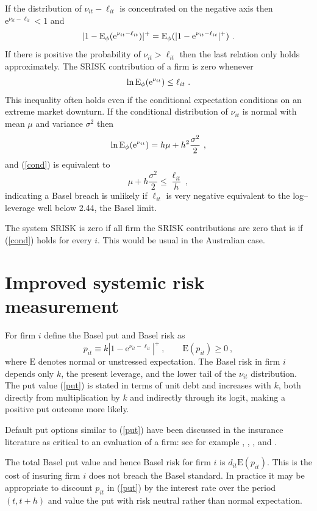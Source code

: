 \documentclass[authoryear]{elsarticle}
\newcommand{\E}{\mathrm{E}}
\newcommand{\e}{\mathrm{e}}
\newcommand{\eref}[1]{(\ref{#1})}
\newcommand{\cq}{\ , \qquad}
\newcommand{\be}[1]{\begin{equation}\label{#1}}
\newcommand{\ee}{\end{equation}}
\begin{document}
 If the  distribution of $\nu_{it}-\ell_{it}$ is concentrated on the negative axis then  $\e^{\nu_{it}-\ell_{it}}<1$ and
$$
|1-\Es(\e^{\nu_{it}-\ell_{it}})|^+ =\Es(|1-\e^{\nu_{it}-\ell_{it}}|^+)\ .
$$
If there is positive  the probability of $\nu_{it}>\ell_{it}$  then the last relation only holds approximately.   The SRISK contribution of a firm is zero whenever
\be{cond}
\ln \Es(\e^{\nu_{it}})\le\ell_{it}\ .
\ee
This inequality often holds even if the conditional expectation conditions on an extreme market downturn.  If the conditional distribution of $\nu_{it}$ is normal with mean $\mu$ and variance $\sigma^2$ then
$$
\ln \Es(\e^{\nu_{it}}) = h\mu +h^2\frac{\sigma^2}{2}\ ,
$$
and  \eref{cond} is equivalent to
$$
\mu +h\frac{\sigma^2}{2}\le \frac{\ell_{it}}{h} \ ,
$$
indicating a Basel breach is unlikely if $\ell_{it}$ is very negative equivalent to the log--leverage well below 2.44, the Basel limit.


The system SRISK is zero if all firm the SRISK contributions are zero that is if \eref{cond} holds for every $i$.  This would be usual in the Australian case.



\section{Improved systemic risk measurement}

For  firm $i$ define the  Basel put and  Basel risk as 
\be{put}
p_{it}\equiv k |1-\e^{\nu_{it}-\ell_{it}}|^+\cq \E(p_{it})\ge 0\ ,
\ee
where $\E$ denotes normal or unstressed expectation.  The Basel risk in firm $i$ depends only $k$,  the present leverage,  and the lower tail of the  $\nu_{it}$ distribution.  The put value \eref{put} is stated in terms of unit debt and increases with $k$, both directly from  multiplication by $k$ and indirectly through its logit, making a positive put outcome more likely.  

Default put options similar to \eref{put} have been discussed in the insurance literature as critical to an evaluation of a firm:  see for
example \citet{merton1977analytic}, \citet{doherty1986price}, \citet{cummins1988risk}, \citet{myers2001capital} and \citet{sherris2006solvency}.

The total Basel put value and hence Basel risk for firm  $i$ is   $d_{it}\E(p_{it})$.   This is the cost of insuring firm $i$ does not breach the Basel standard.  In practice it may be appropriate to discount $p_{it}$ in \eref{put} by the interest rate over the period $(t,t+h)$ and value the put with risk neutral rather than normal expectation.       
\end{document}
